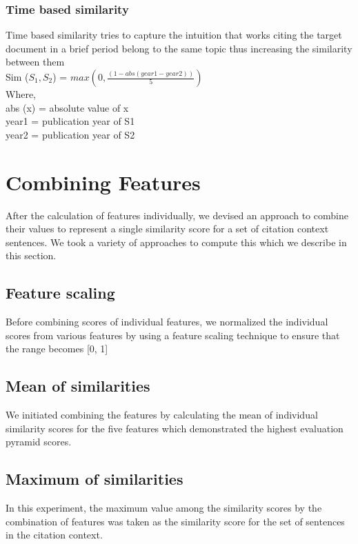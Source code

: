\subsubsection{Time based similarity}  
Time based similarity tries to capture the intuition that works citing the target document in a brief period belong to the same topic thus increasing the similarity between them \\
Sim ($S_1, S_2$) = $max(0, \frac{(1 - abs(year1 - year2))}{5})$\\
Where,\\
abs (x) = absolute value of x\\
year1 = publication year of S1\\
year2 = publication year of S2\\


\section{Combining Features}
After the calculation of features individually, we devised an approach to combine their values to represent a single similarity score for a set of citation context sentences. We took a variety of approaches to compute this which we describe in this section.

\subsection{Feature scaling} \label{scaling}

Before combining scores of individual features, we normalized the individual scores from various features by using a feature scaling technique to ensure that the range becomes [0, 1] 

\subsection{Mean of similarities} \label{mean}
We initiated combining the features by calculating the mean of individual similarity scores for the five features which demonstrated the highest evaluation pyramid scores.

\subsection{Maximum of similarities} \label{max}
In this experiment, the maximum value among the similarity scores by the combination of features was taken as the similarity score for the set of sentences in the citation context. 

